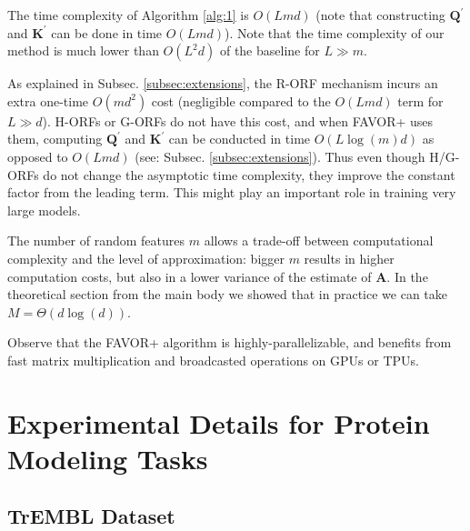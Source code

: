 The time complexity of Algorithm \ref{alg:1} is $O(L m d)$ (note that constructing $\mathbf{Q}^{\prime}$ and $\mathbf{K}^{\prime}$ can be done in time $O(Lmd)$). Note that the time complexity of our method is much lower than $O(L^2 d)$ of the baseline for $L \gg m$.

As explained in Subsec. \ref{subsec:extensions}, the R-ORF mechanism incurs an extra one-time $O(md^{2})$ cost (negligible compared to the $O(Lmd)$ term for $L \gg d$). H-ORFs or G-ORFs do not have this cost, and when FAVOR+ uses them, computing $\mathbf{Q}^{\prime}$ and $\mathbf{K}^{\prime}$ can be conducted in time $O(L\log(m)d)$ as opposed to $O(Lmd)$ (see: Subsec. \ref{subsec:extensions}). Thus even though H/G-ORFs do not change the asymptotic time complexity, they improve the constant factor from the leading term. This might play an important role in training very large models. 

The number of random features $m$ allows a trade-off between computational complexity and the level of approximation: bigger $m$ results in higher computation costs, but also in a lower variance of the estimate of $\mathbf{A}$. In the theoretical section from the main body we showed that in practice we can take $M=\Theta(d\log(d))$.

Observe that the FAVOR+ algorithm is highly-parallelizable, and benefits from fast matrix multiplication and broadcasted operations on GPUs or TPUs.

\newpage

\section{Experimental Details for Protein Modeling Tasks}
\label{appendix:protein_extended}
\subsection{TrEMBL Dataset}

